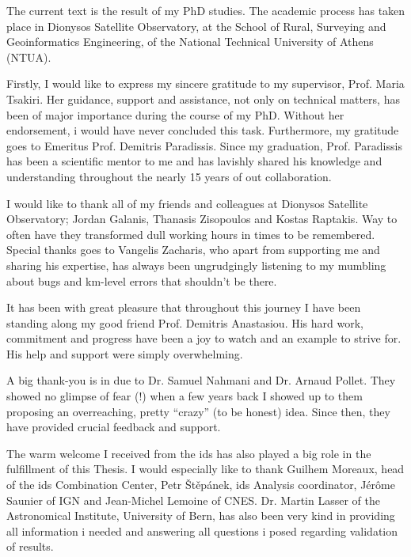 The current text is the result of my PhD studies. The academic process has
taken place in Dionysos Satellite Observatory, at the School of Rural, Surveying 
and Geoinformatics Engineering, of the National Technical University of Athens 
(NTUA).

Firstly, I would like to express my sincere gratitude to my supervisor, Prof. Maria 
Tsakiri. Her guidance, support and assistance, not only on technical matters, has 
been of major importance during the course of my PhD. Without her endorsement, i 
would have never concluded this task. Furthermore, my gratitude goes to Emeritus Prof. 
Demitris Paradissis. Since my graduation, Prof. Paradissis has been a scientific 
mentor to me and has lavishly shared his knowledge and understanding throughout 
the nearly 15 years of out collaboration. 

I would like to thank all of my friends and colleagues at Dionysos Satellite 
Observatory; Jordan Galanis, Thanasis Zisopoulos and Kostas Raptakis. Way to 
often have they transformed dull working hours in times to be remembered. Special 
thanks goes to Vangelis Zacharis, who apart from supporting me and sharing his 
expertise, has always been ungrudgingly listening to my mumbling about bugs and 
km-level errors that shouldn't be there.

It has been with great pleasure that throughout this journey I have been standing 
along my good friend Prof. Demitris Anastasiou. His hard work, commitment and 
progress have been a joy to watch and an example to strive for. His help and 
support were simply overwhelming.

A big thank-you is in due to Dr. Samuel Nahmani and Dr. Arnaud Pollet. They showed no 
glimpse of fear (!) when a few years back I showed up to them proposing an overreaching,
pretty ``crazy'' (to be honest) idea. Since then, they have provided crucial 
feedback and support.

The warm welcome I received from the \gls{ids} has also played a big role in the 
fulfillment of this Thesis. I would especially like to thank Guilhem Moreaux, 
head of the \gls{ids} Combination Center, Petr Štěpánek, \gls{ids} Analysis 
coordinator, Jérôme Saunier of IGN and Jean-Michel Lemoine of CNES. 
Dr. Martin Lasser of the Astronomical 
Institute, University of Bern, has also been very kind in providing all information 
i needed and answering all questions i posed regarding validation of results.

